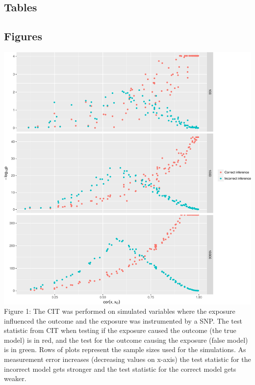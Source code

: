 \documentclass[]{article}
\begin{document}
\newpage

\subsection{Tables}\label{tables}

\newpage

\subsection{Figures}\label{figures}

\includegraphics{manuscript_files/figure-latex/cit_measurement_error_figure-1.pdf}\\
Figure 1: The CIT was performed on simulated variables where the
exposure influenced the outcome and the exposure was instrumented by a
SNP. The test statistic from CIT when testing if the exposure caused the
outcome (the true model) is in red, and the test for the outcome causing
the exposure (false model) is in green. Rows of plots represent the
sample sizes used for the simulations. As measurement error increases
(decreasing values on x-axis) the test statistic for the incorrect model
gets stronger and the test statistic for the correct model gets weaker.

\newpage
\end{document}
